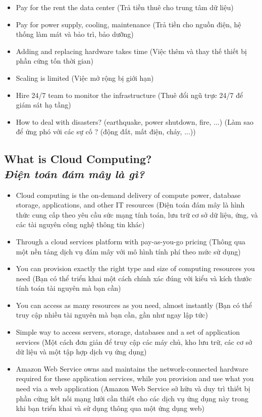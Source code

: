\begin{itemize}
	\item Pay for the rent the data center (Trả tiền thuê cho trung tâm dữ liệu)
	\item Pay for power supply, cooling, maintenance (Trả tiền cho nguồn điện, hệ thống làm mát và bảo trì, bảo dưỡng)
	\item Adding and replacing hardware takes time (Việc thêm và thay thế thiết bị phần cứng tốn thời gian)
	\item Scaling is limited (Việc mở rộng bị giới hạn)
	\item Hire 24/7 team to monitor the infrastructure (Thuê đổi ngũ trực 24/7 để giám sát hạ tầng)
	\item How to deal with disasters? (earthquake, power shutdown, fire, ...) (Làm sao để ứng phó với các sự cố ? (động đất, mất điện, cháy, ...))
	
\end{itemize}

\subsection[What is Cloud Computing?]{\textbf{What is Cloud Computing?} \\
	 \textit{Điện toán đám mây là gì?} }
\begin{itemize}
	\item Cloud computing is the on-demand delivery of compute power, database storage, applications, and other IT resources (Điện toán đám mây là hình thức cung cấp theo yêu cầu sức mạng tính toán, lưu trữ cơ sở dữ liệu, ứng, và các tài nguyên công nghệ thông tin khác)
	\item Through a cloud services platform with pay-as-you-go pricing (Thông qua một nền tảng dịch vụ đám mây với mô hình tính phí theo mức sử dụng)
	\item You can provision exactly the right type and size of computing resources you need (Bạn có thể triển khai một cách chính xác đúng với kiểu và kích thước tính toán tài nguyên mà bạn cần)
	\item You can access as many resources as you need, almost instantly (Bạn có thể truy cập nhiều tài nguyên mà bạn cần, gần như ngay lập tức)
	\item Simple way to access servers, storage, databases and a set of application services (Một cách đơn giản để truy cập các máy chủ, kho lưu trữ, các cơ sở dữ liệu và một tập hợp dịch vụ ứng dụng)
	\item Amazon Web Service owns and maintains the network-connected hardware required for these application services, while you provision and use what you need via a web application (Amazon Web Service sở hữu và duy trì thiết bị phần cứng kết nối mạng lưới cần thiết cho các dịch vụ ứng dụng này trong khi bạn triển khai và sử dụng thông qua một ứng dụng web)
\end{itemize}

